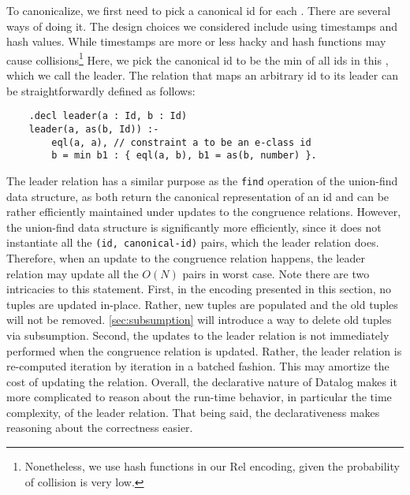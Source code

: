To canonicalize, we first need to pick a canonical id for each \eclass.
There are several ways of doing it.
The design choices we considered include using timestamps and hash values.
While timestamps are more or less hacky and hash functions may 
 cause collisions\footnote{Nonetheless, we use hash functions in our Rel encoding,
 given the probability of collision is very low.}
Here, we pick the canonical id to be the min of all ids in this \eclass,
 which we call the leader. 
The relation that maps an arbitrary id to its leader can be straightforwardly defined
 as follows:
\begin{verbatim}
    .decl leader(a : Id, b : Id)
    leader(a, as(b, Id)) :- 
        eql(a, a), // constraint a to be an e-class id
        b = min b1 : { eql(a, b), b1 = as(b, number) }.
\end{verbatim}

The leader relation has a similar purpose 
 as the \verb|find| operation of 
 the union-find data structure,
 as both return the canonical representation of an \eclass id
 and can be rather efficiently maintained 
 under updates to the congruence relations.
However, 
 the union-find data structure is significantly more efficiently,
 since it does not instantiate all the \verb|(id, canonical-id)|
 pairs, which the leader relation does.
Therefore,
 when an update to the congruence relation happens,
 the leader relation may update all the $O(N)$ pairs
 in worst case.
Note
 there are two intricacies to this statement.
First, in the encoding presented in this section,
 no tuples are updated in-place.
Rather, new tuples are populated and
 the old tuples will not be removed.
\autoref{sec:subsumption} will introduce a way 
 to delete old tuples via subsumption.
Second, the updates to the leader relation 
 is not immediately performed 
 when the congruence relation is updated.
Rather,
 the leader relation is re-computed iteration by iteration
 in a batched fashion.
This may amortize the cost of updating the relation.
Overall,
 the declarative nature of Datalog makes it more complicated
 to reason about the run-time behavior, 
 in particular the time complexity, of the leader relation.
That being said,
 the declarativeness makes reasoning about the correctness easier.

